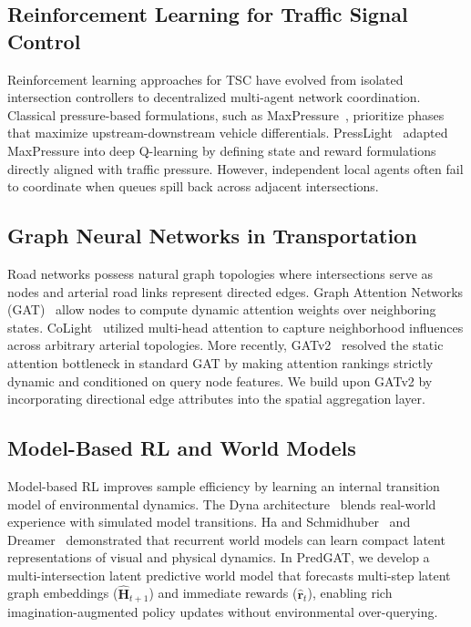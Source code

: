 \documentclass[11pt,a4paper]{article}
\begin{document}
\subsection{Reinforcement Learning for Traffic Signal Control}
Reinforcement learning approaches for TSC have evolved from isolated intersection controllers to decentralized multi-agent network coordination. Classical pressure-based formulations, such as MaxPressure~\cite{varaiya2013max}, prioritize phases that maximize upstream-downstream vehicle differentials. PressLight~\cite{wei2019presslight} adapted MaxPressure into deep Q-learning by defining state and reward formulations directly aligned with traffic pressure. However, independent local agents often fail to coordinate when queues spill back across adjacent intersections.

\subsection{Graph Neural Networks in Transportation}
Road networks possess natural graph topologies where intersections serve as nodes and arterial road links represent directed edges. Graph Attention Networks (GAT)~\cite{velickovic2018graph} allow nodes to compute dynamic attention weights over neighboring states. CoLight~\cite{wei2019colight} utilized multi-head attention to capture neighborhood influences across arbitrary arterial topologies. More recently, GATv2~\cite{brody2022gatv2} resolved the static attention bottleneck in standard GAT by making attention rankings strictly dynamic and conditioned on query node features. We build upon GATv2 by incorporating directional edge attributes into the spatial aggregation layer.

\subsection{Model-Based RL and World Models}
Model-based RL improves sample efficiency by learning an internal transition model of environmental dynamics. The Dyna architecture~\cite{sutton1991dyna} blends real-world experience with simulated model transitions. Ha and Schmidhuber~\cite{ha2018worldmodels} and Dreamer~\cite{hafner2023mastering} demonstrated that recurrent world models can learn compact latent representations of visual and physical dynamics. In PredGAT, we develop a multi-intersection latent predictive world model that forecasts multi-step latent graph embeddings ($\widehat{\mathbf{H}}_{t+1}$) and immediate rewards ($\widehat{\mathbf{r}}_t$), enabling rich imagination-augmented policy updates without environmental over-querying.
\end{document}
